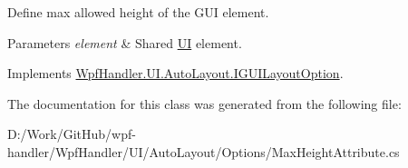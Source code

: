 Define max allowed height of the G\+UI element. 


\begin{DoxyParams}{Parameters}
{\em element} & Shared \mbox{\hyperlink{namespace_wpf_handler_1_1_u_i}{UI}} element.\\
\hline
\end{DoxyParams}


Implements \mbox{\hyperlink{interface_wpf_handler_1_1_u_i_1_1_auto_layout_1_1_i_g_u_i_layout_option_ac2d2fa8aeaf753b3248381399f991005}{Wpf\+Handler.\+U\+I.\+Auto\+Layout.\+I\+G\+U\+I\+Layout\+Option}}.



The documentation for this class was generated from the following file\+:\begin{DoxyCompactItemize}
\item 
D\+:/\+Work/\+Git\+Hub/wpf-\/handler/\+Wpf\+Handler/\+U\+I/\+Auto\+Layout/\+Options/Max\+Height\+Attribute.\+cs\end{DoxyCompactItemize}
